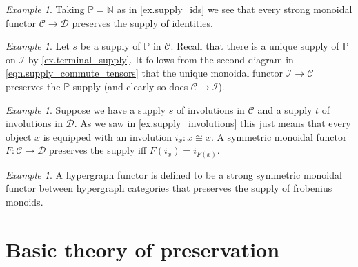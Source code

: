 \documentclass[11pt, oneside, article]{memoir}
\theoremstyle{plain}
\theoremstyle{definition}
\theoremstyle{remark}
\newtheorem{example}[theorem]{Example}
\newcommand{\cat}[1]{\mathcal{#1}}%
\newcommand{\nn}{\mathbb{N}}
\newcommand{\pp}{\mathbb{P}}
\newcommand{\zero}{\cat{I}}
\begin{document}
\begin{example}
Taking $\pp=\nn$ as in \cref{ex.supply_ids} we see that every strong monoidal functor $\cat{C}\to\cat{D}$ preserves the supply of identities.
\end{example}

\begin{example}
Let $s$ be a supply of $\pp$ in $\cat{C}$. Recall that there is a unique supply of $\pp$ on $\zero$ by \cref{ex.terminal_supply}. It follows from the second diagram in \cref{eqn.supply_commute_tensors} that the unique monoidal functor $\zero\to\cat{C}$ preserves the $\pp$-supply (and clearly so does $\cat{C}\to\zero$).
\end{example}

\begin{example}\label{ex.preserve_involutions}
Suppose we have a supply $s$ of involutions in $\cat{C}$ and a supply $t$ of involutions in $\cat{D}$. As we saw in \cref{ex.supply_involutions} this just means that every object $x$ is equipped with an involution $i_x\colon x\cong x$. A symmetric monoidal functor $F\colon\cat{C}\to\cat{D}$ preserves the supply iff $F(i_x)=i_{F(x)}$.
\end{example}

\begin{example}
  A hypergraph functor is defined to be a strong symmetric monoidal functor between hypergraph categories that preserves the supply of frobenius monoids.
\end{example}


\section{Basic theory of preservation}\label{sec.preserve_thms}
\end{document}
